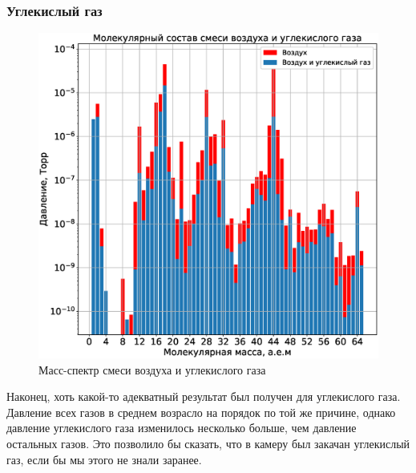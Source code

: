 \documentclass[a4paper,14pt]{extarticle}
\begin{document}
			\subsubsection{Углекислый газ}
				\begin{figure}[h!]
					\centering
					\includegraphics[width=.75\linewidth]{Lab2_2.eps}
					\caption{Масс-спектр смеси воздуха и углекислого газа}
					\label{fig6}
				\end{figure}
				Наконец, хоть какой-то адекватный результат был получен для углекислого газа. Давление всех газов в среднем возрасло на порядок по той же причине, однако давление углекислого газа изменилось несколько больше, чем давление остальных газов. Это позволило бы сказать, что в камеру был закачан углекислый газ, если бы мы этого не знали заранее.
\end{document}
